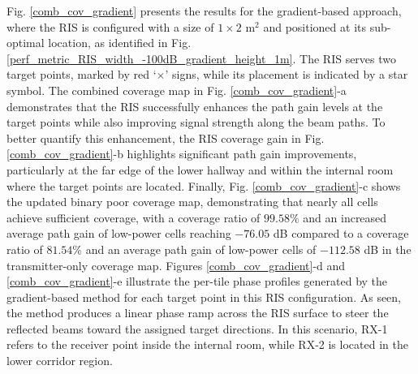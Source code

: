 \documentclass{IEEEoj}
\begin{document}
Fig. \ref{comb_cov_gradient} presents the results for the gradient-based approach, where the RIS is configured with a size of $1 \times 2$ m$^2$ and positioned at its sub-optimal location, as identified in Fig. \ref{perf_metric_RIS_width_-100dB_gradient_height_1m}. The RIS serves two target points, marked by red `$\times$' signs, while its placement is indicated by a star symbol. The combined coverage map in Fig. \ref{comb_cov_gradient}-a demonstrates that the RIS successfully enhances the path gain levels at the target points while also improving signal strength along the beam paths. To better quantify this enhancement, the RIS coverage gain in Fig. \ref{comb_cov_gradient}-b highlights significant path gain improvements, particularly at the far edge of the lower hallway and within the internal room where the target points are located. Finally, Fig. \ref{comb_cov_gradient}-c shows the updated binary poor coverage map, demonstrating that nearly all cells achieve sufficient coverage, with a coverage ratio of $99.58\%$ and an increased average path gain of low-power cells reaching $-76.05$ dB compared to a coverage ratio of $81.54\%$ and an average path gain of low-power cells of $-112.58$ dB in the transmitter-only coverage map. Figures \ref{comb_cov_gradient}-d and \ref{comb_cov_gradient}-e illustrate the per-tile phase profiles generated by the gradient-based method for each target point in this RIS configuration. As seen, the method produces a linear phase ramp across the RIS surface to steer the reflected beams toward the assigned target directions. In this scenario, RX-1 refers to the receiver point inside the internal room, while RX-2 is located in the lower corridor region.
\end{document}

